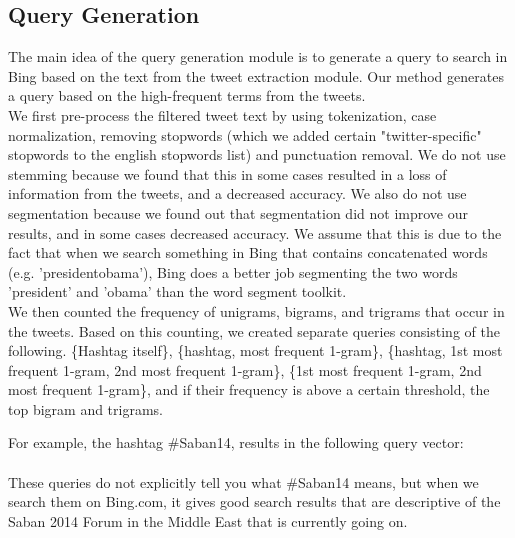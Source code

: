 \subsection{Query Generation}
The main idea of the query generation module is to generate a query to search in Bing based on the text from the tweet extraction module. Our method generates a query based on the high-frequent terms from the tweets.\\
We first pre-process the filtered tweet text by using tokenization, case normalization, removing stopwords (which we added certain "twitter-specific" stopwords to the english stopwords list) and punctuation removal. We do not use stemming because we found that this in some cases resulted in a loss of information from the tweets, and a decreased accuracy. We also do not use segmentation because we found out that segmentation did not improve our results, and in some cases decreased accuracy. We assume that this is due to the fact that when we search something in Bing that contains concatenated words (e.g. 'presidentobama'), Bing does a better job segmenting the two words 'president' and 'obama' than the word segment toolkit. \\
We then counted the frequency of unigrams, bigrams, and trigrams that occur in the tweets. Based on this counting, we created separate queries consisting of the following. \{Hashtag itself\}, \{hashtag, most frequent 1-gram\}, \{hashtag, 1st most frequent 1-gram, 2nd most frequent 1-gram\},  \{1st most frequent 1-gram, 2nd most frequent 1-gram\}, and if their frequency is above a certain threshold, the top bigram and trigrams.

For example, the hashtag
\#Saban14, results in the following query vector: \\  
\\
These queries do not explicitly tell you what \#Saban14 means, but when we search them on Bing.com, it gives good search results that are descriptive of the Saban 2014 Forum in the Middle East that is currently going on.
